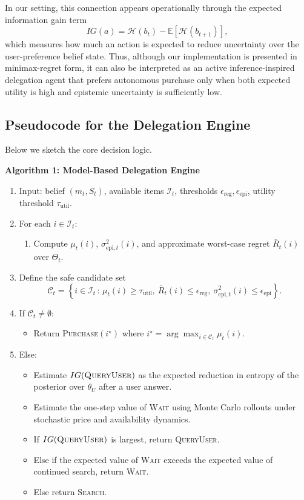 \documentclass[11pt]{article}
\begin{document}
In our setting, this connection appears operationally through the expected information gain term
\begin{equation}
IG(a) = \mathcal{H}(b_t) - \mathbb{E}[\mathcal{H}(b_{t+1})],
\end{equation}
which measures how much an action is expected to reduce uncertainty over the user-preference belief state. Thus, although our implementation is presented in minimax-regret form, it can also be interpreted as an active inference-inspired delegation agent that prefers autonomous purchase only when both expected utility is high and epistemic uncertainty is sufficiently low.

\subsection{Pseudocode for the Delegation Engine}

Below we sketch the core decision logic.

\medskip
\noindent\textbf{Algorithm 1: Model-Based Delegation Engine}
\begin{enumerate}
    \item Input: belief $(m_t, S_t)$, available items $\mathcal{I}_t$, thresholds $\epsilon_{\text{reg}}, \epsilon_{\text{epi}}$, utility threshold $\tau_{\text{util}}$.
    \item For each $i \in \mathcal{I}_t$:
    \begin{enumerate}
        \item Compute $\mu_t(i)$, $\sigma_{\text{epi},t}^2(i)$, and approximate worst-case regret $\bar{R}_t(i)$ over $\Theta_t$.
    \end{enumerate}
    \item Define the safe candidate set
    \[
    \mathcal{C}_t = \left\{ i \in \mathcal{I}_t \,:\, \mu_t(i) \geq \tau_{\text{util}},\ \bar{R}_t(i) \leq \epsilon_{\text{reg}},\ \sigma_{\text{epi},t}^2(i) \leq \epsilon_{\text{epi}} \right\}.
    \]
    \item If $\mathcal{C}_t \neq \emptyset$:
    \begin{itemize}
        \item Return \textsc{Purchase}$(i^\star)$ where $i^\star = \arg\max_{i \in \mathcal{C}_t} \mu_t(i)$.
    \end{itemize}
    \item Else:
    \begin{itemize}
        \item Estimate $IG(\textsc{QueryUser})$ as the expected reduction in entropy of the posterior over $\theta_U$ after a user answer.
        \item Estimate the one-step value of \textsc{Wait} using Monte Carlo rollouts under stochastic price and availability dynamics.
        \item If $IG(\textsc{QueryUser})$ is largest, return \textsc{QueryUser}.
        \item Else if the expected value of \textsc{Wait} exceeds the expected value of continued search, return \textsc{Wait}.
        \item Else return \textsc{Search}.
    \end{itemize}
\end{enumerate}
\end{document}
